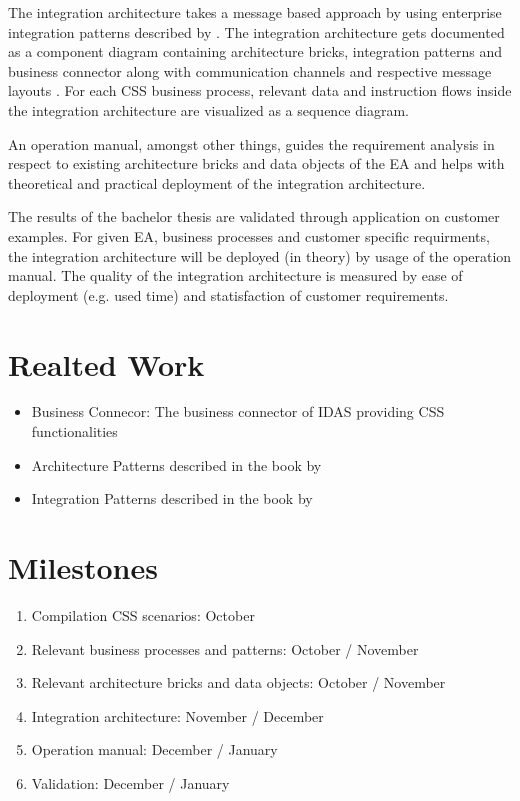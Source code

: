 \documentclass{article}
\begin{document}
The integration architecture takes a message based approach by using enterprise integration patterns described
by \cite{integrationPatterns}.
The integration architecture gets documented as a component diagram
containing architecture bricks, integration patterns and business connector along with communication 
channels and respective message layouts \cite[cf. 16 ff.]{integrationPatterns}.
For each CSS business process, relevant data and instruction flows inside the integration architecture 
are visualized as a sequence diagram.

An operation manual, 
amongst other things, guides the requirement analysis in respect to existing architecture bricks and data 
objects of the EA and helps with theoretical and practical deployment of the integration architecture.

The results of the bachelor thesis are validated through application on customer examples. For given 
EA, business processes and customer specific requirments, the integration architecture will be 
deployed (in theory) by usage of the operation manual.
The quality of the integration architecture is measured by ease of deployment (e.g. used time) and 
statisfaction of customer requirements.

\section{Realted Work}

\begin{itemize}
    \item Business Connecor: The business connector of IDAS providing CSS functionalities
    \item Architecture Patterns described in the book by \cite{architecturePatterns}
    \item Integration Patterns described in the book by \cite{integrationPatterns}
\end{itemize}

\section{Milestones}

\begin{enumerate}
    \item Compilation CSS scenarios: October
    \item Relevant business processes and patterns: October / November
    \item Relevant architecture bricks and data objects: October / November
    \item Integration architecture: November / December
    \item Operation manual: December / January
    \item Validation: December / January
\end{enumerate}

\printbibliography
\end{document}
